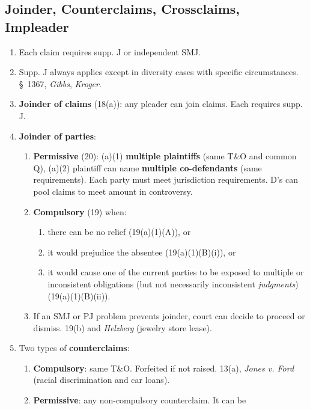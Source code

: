 \subsection{Joinder, Counterclaims, Crossclaims, Impleader}

\begin{enumerate}
    \item Each claim requires supp. J or independent SMJ.
    \item Supp. J always applies except in diversity cases with specific 
    circumstances. \S\ 1367, \emph{Gibbs}, \emph{Kroger}.
    \item \textbf{Joinder of claims} (18(a)): any pleader can join claims.  
    Each requires supp. J.  \item \textbf{Joinder of parties}:
    \begin{enumerate}
        \item \textbf{Permissive} (20): (a)(1) \textbf{multiple plaintiffs} 
        (same T\&O and common Q), (a)(2) plaintiff can name \textbf{multiple 
        co-defendants} (same requirements). Each party must meet jurisdiction 
        requirements. D's can pool claims to meet amount in controversy.
        \item \textbf{Compulsory} (19) when:
        \begin{enumerate}
            \item there can be no relief (19(a)(1)(A)), or
            \item it would prejudice the absentee (19(a)(1)(B)(i)), or
            \item it would cause one of the current parties to be exposed to 
            multiple or inconsistent obligations (but not necessarily 
            inconsistent \emph{judgments}) (19(a)(1)(B)(ii)).
        \end{enumerate}
        \item If an SMJ or PJ problem prevents joinder, court can decide to 
        proceed or dismiss. 19(b) and \emph{Helzberg} (jewelry store lease).
    \end{enumerate}
    \item Two types of \textbf{counterclaims}:
    \begin{enumerate}
        \item \textbf{Compulsory}: same T\&O. Forfeited if not raised. 13(a), 
        \emph{Jones v. Ford} (racial discrimination and car loans).
        \item \textbf{Permissive}: any non-compulsory counterclaim. It can be 

\end{enumerate}
\end{enumerate}

